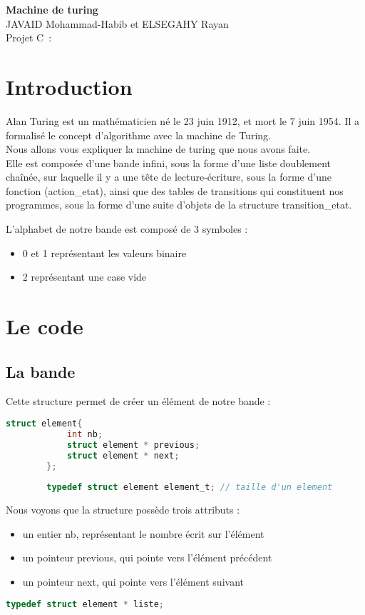 \documentclass[a4paper,10pt]{article}
\begin{document}
\begin{center}
{\Large\bf
Machine de turing\\}
JAVAID Mohammad-Habib et ELSEGAHY Rayan \\
Projet C~: 
\end{center}


\section{Introduction}

    Alan Turing est un mathématicien né le 23 juin 1912, et mort le 7 juin 1954. Il a formalisé le concept d'algorithme avec la machine de Turing.
    \\[1 em]
    Nous allons vous expliquer la machine de turing que nous avons faite. 
    \\[1 em]
    Elle est composée d'une bande infini, sous la forme d'une liste doublement chaînée, sur laquelle il y a une tête de lecture-écriture, sous la forme d'une fonction (action\_etat), ainsi que des tables de transitions qui constituent nos programmes, sous la forme d'une suite d'objets de la structure transition\_etat.
    
    L'alphabet de notre bande est composé de 3 symboles : 
    \begin{itemize}
    \item 0 et 1 représentant les valeurs binaire
    \item 2 représentant une case vide
    \end{itemize}
    
\section{Le code}
    \subsection{La bande}
        Cette structure permet de créer un élément de notre bande :
        \begin{lstlisting}[language=c]
        struct element{ 
        	int nb;
        	struct element * previous;
        	struct element * next;
        };
        
        typedef struct element element_t; // taille d'un element 
        \end{lstlisting}
        
        Nous voyons que la structure possède trois attributs : 
        
        \begin{itemize}
        \item un entier nb, représentant le nombre écrit sur l'élément
        \item un pointeur previous, qui pointe vers l'élément précédent
        \item un pointeur next, qui pointe vers l'élément suivant
        \end{itemize}
        \begin{lstlisting}[language=c]
        typedef struct element * liste;
        \end{lstlisting}
        
\end{document}
